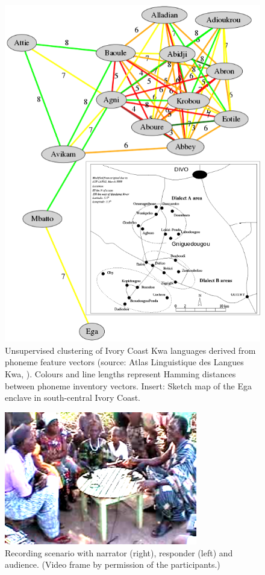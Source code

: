 \documentclass[output=paper,colorlinks,citecolor=brown]{langscibook}
\begin{document}
\begin{figure}
\includegraphics[width=.9\textwidth]{gibbon_figure01.png}
\caption{\label{fig:fig01}Unsupervised clustering of Ivory Coast Kwa languages derived from phoneme feature vectors (source: Atlas Linguistique des Langues Kwa, \citealt{herault1983}). Colours and line lengths represent Hamming distances between phoneme inventory vectors. Insert: Sketch map of the Ega enclave in south-central Ivory Coast.}
\end{figure}

\begin{figure}
\includegraphics[width=0.75\textwidth]{gibbon_figure02.png}
\caption{\label{fig:fig02}Recording scenario with narrator (right), responder (left) and audience. (Video frame by permission of the participants.)}
\end{figure}
\end{document}
